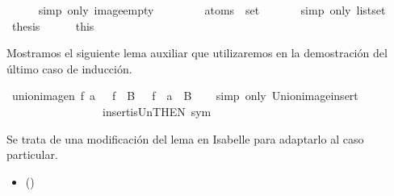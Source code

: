 \begin{isabellebody}
\ \ \ \ \isamarkupfalse%
\ {\isacharparenleft}simp\ only{\isacharcolon}\ image{\isacharunderscore}empty{\isacharparenright}\isanewline
\ \ \isamarkupfalse%
\ \isamarkupfalse%
\ {\isachardoublequoteopen}{\isasymdots}\ {\isacharequal}\ {\isasymUnion}\ {\isacharparenleft}atoms\ {\isacharbackquote}\ set\ {\isacharbrackleft}{\isacharbrackright}{\isacharparenright}{\isachardoublequoteclose}\isanewline
\ \ \ \ \isamarkupfalse%
\ {\isacharparenleft}simp\ only{\isacharcolon}\ list{\isachardot}set{\isacharparenright}\isanewline
\ \ \isamarkupfalse%
\ \isamarkupfalse%
\ {\isacharquery}thesis\isanewline
\ \ \ \ \isamarkupfalse%
\ this\isanewline
{}\isamarkupfalse%
%
\endisatagproof
{\isafoldproof}%
%
\isadelimproof
%
\endisadelimproof
%
\begin{isamarkuptext}%
Mostramos el siguiente lema auxiliar que utilizaremos en la
  demostración del último caso de inducción.%
\end{isamarkuptext}\isamarkuptrue%
\isamarkupfalse%
\ union{\isacharunderscore}imagen{\isacharcolon}\ {\isachardoublequoteopen}f\ a\ {\isasymunion}\ {\isasymUnion}\ {\isacharparenleft}f\ {\isacharbackquote}\ B{\isacharparenright}\ {\isacharequal}\ {\isasymUnion}\ {\isacharparenleft}f\ {\isacharbackquote}\ {\isacharparenleft}{\isacharbraceleft}a{\isacharbraceright}\ {\isasymunion}\ B{\isacharparenright}{\isacharparenright}{\isachardoublequoteclose}\isanewline
%
\isadelimproof
\ \ %
\endisadelimproof
%
\isatagproof
{}\isamarkupfalse%
\ {\isacharparenleft}simp\ only{\isacharcolon}\ Union{\isacharunderscore}image{\isacharunderscore}insert\isanewline
\ \ \ \ \ \ \ \ \ \ \ \ \ \ \ \ \ insert{\isacharunderscore}is{\isacharunderscore}Un{\isacharbrackleft}THEN\ sym{\isacharbrackright}{\isacharparenright}%
\endisatagproof
{\isafoldproof}%
%
\isadelimproof
%
\endisadelimproof
%
\begin{isamarkuptext}%
Se trata de una modificación del lema  en 
  Isabelle para adaptarlo al caso particular. 

  \begin{itemize}
    \item[]  
      \hfill ()
  \end{itemize}


\end{isamarkuptext}
\end{isabellebody}
